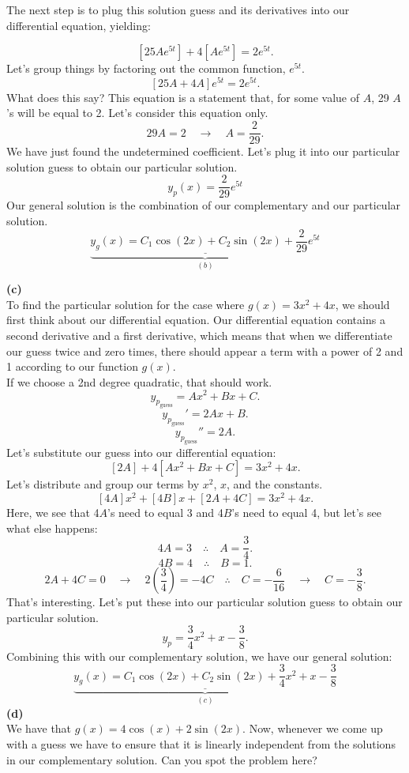 \documentclass[a4paper,12pt]{article}
\begin{document}
The next step is to plug this solution guess and its derivatives into our differential equation, yielding:

$$ \left[25Ae^{5t}\right] + 4\left[Ae^{5t}\right] = 2e^{5t}. $$
Let's group things by factoring out the common function, $e^{5t}$.
$$ [25A + 4A]e^{5t} = 2e^{5t}. $$
What does this say? This equation is a statement that, for some value of $A$, 29 $A$'s will be equal to 2. Let's consider this equation only.
$$ 29A = 2 \quad\rightarrow\quad A = \frac{2}{29}. $$
We have just found the undetermined coefficient. Let's plug it into our particular solution guess to obtain our particular solution.
$$ \boxed{y_p(x) = \frac{2}{29}e^{5t}} $$
Our general solution is the combination of our complementary and our particular solution.
$$ \underbrace{\underline{\boxed{y_{g}(x) = C_1\cos{(2x)} + C_2\sin{(2x)} + \frac{2}{29}e^{5t}}}}_{(b)} $$

\textbf{(c)}\\
To find the particular solution for the case where $g(x)=3 x^2+4 x$, we should first think about our differential equation. Our differential equation contains a second derivative and a first derivative, which means that when we differentiate our guess twice and zero times, there should appear a term with a power of 2 and 1 according to our function $g(x)$.\\

If we choose a 2nd degree quadratic, that should work.
$$ y_{p_{\text{guess}}} = Ax^2 + Bx + C. $$
$$  y_{p_{\text{guess}}}' = 2Ax + B. $$
$$  y_{p_{\text{guess}}}'' = 2A. $$
Let's substitute our guess into our differential equation:
$$ \left[2A\right] + 4\left[Ax^2 + Bx + C\right] = 3x^2 + 4x. $$
Let's distribute and group our terms by $x^2$, $x$, and the constants.
$$ [4A]x^2 + [4B]x + [2A + 4C] = 3x^2 + 4x. $$
Here, we see that 4$A$'s need to equal 3 and 4$B$'s need to equal 4, but let's see what else happens:
$$ 4A = 3 \quad\therefore\quad A = \frac{3}{4}. $$
$$ 4B = 4 \quad\therefore\quad B = 1. $$
$$ 2A + 4C = 0 \quad\rightarrow\quad 2\left(\frac{3}{4}\right) = -4C \quad\therefore\quad C = -\frac{6}{16} \quad\rightarrow\quad C = -\frac{3}{8}. $$
That's interesting. Let's put these into our particular solution guess to obtain our particular solution.
$$ y_{p} = \frac{3}{4}x^2 + x -\frac{3}{8}. $$
Combining this with our complementary solution, we have our general solution:
$$ \underbrace{\underline{\boxed{y_g(x) = C_1\cos{(2x)} + C_2\sin{(2x)} + \frac{3}{4}x^2 + x -\frac{3}{8}}}}_{(c)} $$
\textbf{(d)}\\
We have that $g(x)=4 \cos (x)+2 \sin (2 x)$. Now, whenever we come up with a guess we have to ensure that it is linearly independent from the solutions in our complementary solution. Can you spot the problem here?\\
\end{document}
